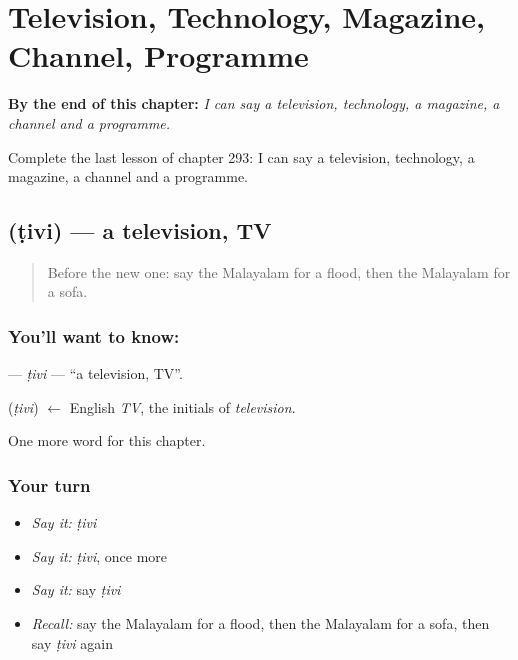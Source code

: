 
\chapter{Television, Technology, Magazine, Channel, Programme}
\label{ch:ml-television-technology-magazine-channel-programme}

\begin{chapteropening}
\textbf{By the end of this chapter:} \emph{I can say a television, technology, a magazine, a channel and a programme.}

Complete the last lesson of chapter 293: I can say a television, technology, a magazine, a channel and a programme.
\end{chapteropening}

\section[\texorpdfstring{\ml{ടിവി} (ṭivi)}{ടിവി (ṭivi)}]{ (ṭivi) — a television, TV}

\label{lesson:ML-C293-tivi}



\begin{quote}
Before the new one: say the Malayalam for a flood, then the Malayalam for a sofa.
\end{quote}

\subsection*{You'll want to know: }
\textbf{} — \emph{ṭivi} — \textquotedblleft{}a television, TV\textquotedblright{}.

\begin{cousinweb}
\textbf{} (\emph{ṭivi}) $\leftarrow$ English \emph{TV}, the initials of \emph{television}.
\end{cousinweb}

\begin{grammarlens}[title={What you've built}]
One more word for this chapter.
\end{grammarlens}

\subsection*{Your turn}
\begin{itemize}
\raggedright
  \item \emph{Say it:} \emph{ṭivi}
  \item \emph{Say it:} \emph{ṭivi}, once more
  \item \emph{Say it:} say \emph{ṭivi}
  \item \emph{Recall:} say the Malayalam for a flood, then the Malayalam for a sofa, then say \emph{ṭivi} again
\end{itemize}

